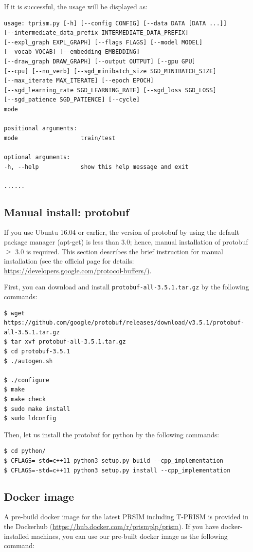 \documentclass[a4paper]{report}
\begin{document}
If it is successful, the usage will be displayed as:
\begin{verbatim}
usage: tprism.py [-h] [--config CONFIG] [--data DATA [DATA ...]]
[--intermediate_data_prefix INTERMEDIATE_DATA_PREFIX]
[--expl_graph EXPL_GRAPH] [--flags FLAGS] [--model MODEL]
[--vocab VOCAB] [--embedding EMBEDDING]
[--draw_graph DRAW_GRAPH] [--output OUTPUT] [--gpu GPU]
[--cpu] [--no_verb] [--sgd_minibatch_size SGD_MINIBATCH_SIZE]
[--max_iterate MAX_ITERATE] [--epoch EPOCH]
[--sgd_learning_rate SGD_LEARNING_RATE] [--sgd_loss SGD_LOSS]
[--sgd_patience SGD_PATIENCE] [--cycle]
mode

positional arguments:
mode                  train/test

optional arguments:
-h, --help            show this help message and exit

......
\end{verbatim}




\subsection*{Manual install: protobuf}
If you use Ubuntu 16.04 or earlier, the version of protobuf by using the default package manager (apt-get) is less than 3.0; hence, manual installation of protobuf $\geq$ 3.0 is required.
This section describes the brief instruction for manual installation (see the official page for details: \url{https://developers.google.com/protocol-buffers/}).

First, you can download and install {\tt protobuf-all-3.5.1.tar.gz} by the following commands:
\begin{verbatim}
$ wget https://github.com/google/protobuf/releases/download/v3.5.1/protobuf-all-3.5.1.tar.gz
$ tar xvf protobuf-all-3.5.1.tar.gz
$ cd protobuf-3.5.1
$ ./autogen.sh

$ ./configure
$ make
$ make check
$ sudo make install
$ sudo ldconfig
\end{verbatim}

Then, let us install the protobuf for python by the following commands:
\begin{verbatim}
$ cd python/
$ CFLAGS=-std=c++11 python3 setup.py build --cpp_implementation
$ CFLAGS=-std=c++11 python3 setup.py install --cpp_implementation
\end{verbatim}

\subsection*{Docker image}
A pre-build docker image for the latest PRSIM including T-PRISM is provided in the Dockerhub (\url{https://hub.docker.com/r/prismplp/prism}). 
If you have docker-installed machines, you can use our pre-built docker image  as the following command:
\end{document}
